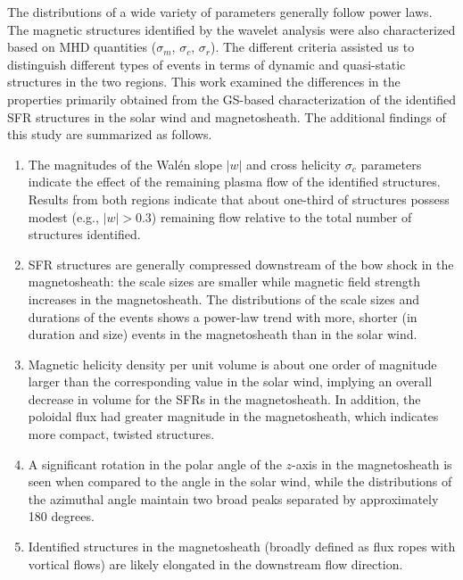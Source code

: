 The distributions of a wide variety of parameters generally follow power laws. The magnetic structures identified by the wavelet analysis were also characterized based on MHD quantities ($\sigma_m$, $\sigma_c$, $\sigma_r$). The different criteria assisted us to distinguish different types of events in terms of dynamic and quasi-static structures in the two regions. This work examined the differences in the properties primarily obtained from the GS-based characterization of the identified SFR structures in the solar wind and magnetosheath. The additional findings of this study are summarized as follows.
\begin{enumerate}
    \item The magnitudes of the Wal\'en slope $|w|$ and cross helicity $\sigma_c$ parameters indicate the effect of the remaining plasma flow of the identified structures. Results from both regions indicate that about one-third of structures possess modest (e.g., $|w|>0.3$) remaining flow relative to the total number of structures identified.
    \item SFR structures are generally compressed downstream of the bow shock in the magnetosheath: the scale sizes are smaller while magnetic field strength increases in the magnetosheath. The distributions of the scale sizes and durations of the events shows a power-law trend with more, shorter (in duration and size) events in the magnetosheath than in the solar wind.
    \item Magnetic helicity density per unit volume is about one order of magnitude larger than the corresponding value in the solar wind, implying an overall decrease in volume for the SFRs in the magnetosheath. In addition, the poloidal flux had greater magnitude in the magnetosheath, which indicates more compact, twisted structures.
    \item A significant rotation in the polar angle of the $z$-axis in the magnetosheath is seen when compared to the angle in the solar wind, while the distributions of the azimuthal angle maintain two broad peaks separated by approximately 180 degrees.
    \item Identified structures in the magnetosheath (broadly defined as flux ropes with vortical flows) are likely elongated in the downstream flow direction.
\end{enumerate}